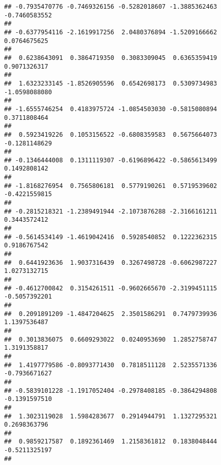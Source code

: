 \documentclass[]{article}
\begin{document}
\begin{verbatim}
## -0.7935470776 -0.7469326156 -0.5282018607 -1.3885362463 -0.7460583552 
##                                                                       
## -0.6377954116 -2.1619917256  2.0480376894 -1.5209166662  0.0764675625 
##                                                                       
##  0.6238643091  0.3864719350  0.3083309045  0.6365359419  0.9071326317 
##                                                                       
##  1.6323233145 -1.8526905596  0.6542698173  0.5309734983 -1.0598088080 
##                                                                       
## -1.6555746254  0.4183975724 -1.0854503030 -0.5815080894  0.3711808464 
##                                                                       
##  0.5923419226  0.1053156522 -0.6808359583  0.5675664073 -0.1281148629 
##                                                                       
## -0.1346444008  0.1311119307 -0.6196896422 -0.5865613499  0.1492808142 
##                                                                       
## -1.8168276954  0.7565806181  0.5779190261  0.5719539602 -0.4221559815 
##                                                                       
## -0.2815218321 -1.2389491944 -2.1073876288 -2.3166161211  0.3443572412 
##                                                                       
## -0.5614534149 -1.4619042416  0.5928540852  0.1222362315  0.9186767542 
##                                                                       
##  0.6441923636  1.9037316439  0.3267498728 -0.6062987227  1.0273132715 
##                                                                       
## -0.4612700842  0.3154261511 -0.9602665670 -2.3199451115 -0.5057392201 
##                                                                       
##  0.2091891209 -1.4847204625  2.3501586291  0.7479739936  1.1397536487 
##                                                                       
##  0.3013836075  0.6609293022  0.0240953690  1.2852758747  1.3191358817 
##                                                                       
##  1.4197779586 -0.8093771430  0.7818511128  2.5235571336 -0.7936671627 
##                                                                       
## -0.5839101228 -1.1917052404 -0.2978408185 -0.3864294808 -0.1391597510 
##                                                                       
##  1.3023119028  1.5984283677  0.2914944791  1.1327295321  0.2698363796 
##                                                                       
##  0.9859217587  0.1892361469  1.2158361812  0.1838048444 -0.5211325197 
##                                                                       

\end{verbatim}
\end{document}
